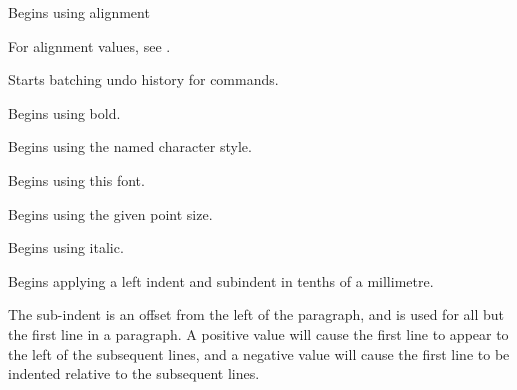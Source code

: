 
Begins using alignment

For alignment values, see .

\label{wxrichtextctrlbeginbatchundo}


Starts batching undo history for commands.

\label{wxrichtextctrlbeginbold}


Begins using bold.

\label{wxrichtextctrlbegincharacterstyle}


Begins using the named character style.

\label{wxrichtextctrlbeginfont}


Begins using this font.

\label{wxrichtextctrlbeginfontsize}


Begins using the given point size.

\label{wxrichtextctrlbeginitalic}


Begins using italic.

\label{wxrichtextctrlbeginleftindent}


Begins applying a left indent and subindent in tenths of a millimetre.

The sub-indent is an offset from the left of the paragraph, and is used for all but the
first line in a paragraph. A positive value will cause the first line to appear to the left
of the subsequent lines, and a negative value will cause the first line to be indented
relative to the subsequent lines.


